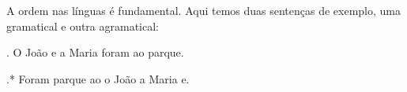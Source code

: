 \documentclass[a4paper]{article}
\begin{document}
\frenchspacing

A ordem nas línguas é fundamental. Aqui temos duas sentenças de exemplo, uma
gramatical e outra agramatical:

\ex. O João e a Maria foram ao parque.

\ex.* Foram parque ao o João a Maria e.
\end{document}
